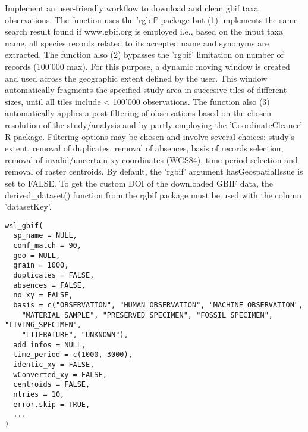 \documentclass[a4paper]{book}
\begin{document}
%
\begin{Description}\relax
Implement an user-friendly workflow to download and clean gbif taxa observations.
The function uses the 'rgbif' package but (1) implements the same search result 
found if www.gbif.org is employed i.e., based on the input taxa name, all species
records related to its accepted name and synonyms are extracted. The function
also (2) bypasses the 'rgbif' limitation on number of records (100'000 max).
For this purpose, a dynamic moving window is created and used across the geographic
extent defined by the user. This window automatically fragments the specified
study area in succesive tiles of different sizes, until all tiles include < 100'000
observations. The function also (3) automatically applies a post-filtering of
observations based on the chosen resolution of the study/analysis and by partly
employing the 'CoordinateCleaner' R package. Filtering options may be chosen and
involve several choices: study's extent, removal of duplicates, removal of absences,
basis of records selection, removal of invalid/uncertain xy coordinates (WGS84), time
period selection and removal of raster centroids. By default, the 'rgbif' argument
hasGeospatialIssue is set to FALSE. To get the custom DOI of the downloaded GBIF data,
the derived\_dataset() function from the rgbif package must be used with the column
'datasetKey'.
\end{Description}
%
\begin{Usage}
\begin{verbatim}
wsl_gbif(
  sp_name = NULL,
  conf_match = 90,
  geo = NULL,
  grain = 1000,
  duplicates = FALSE,
  absences = FALSE,
  no_xy = FALSE,
  basis = c("OBSERVATION", "HUMAN_OBSERVATION", "MACHINE_OBSERVATION",
    "MATERIAL_SAMPLE", "PRESERVED_SPECIMEN", "FOSSIL_SPECIMEN", "LIVING_SPECIMEN",
    "LITERATURE", "UNKNOWN"),
  add_infos = NULL,
  time_period = c(1000, 3000),
  identic_xy = FALSE,
  wConverted_xy = FALSE,
  centroids = FALSE,
  ntries = 10,
  error.skip = TRUE,
  ...
)
\end{verbatim}
\end{Usage}
%
\end{document}
